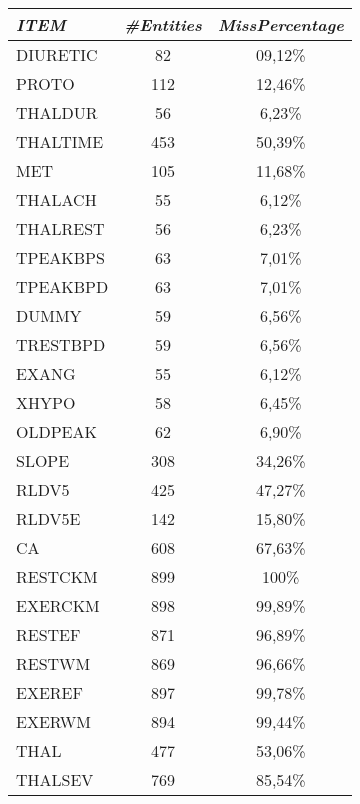 \documentclass[a4paper,12pt]{article}
\begin{document}
\begin{multicols}{2}
\begin{tabular}{|l|c|c|}
            
            \end{tabular}
            \begin{tabular}{|l|c|c|} \hline    
                
                \textit{ITEM} 	& \textit{\#Entities}	& \textit{MissPercentage} \\
                \hline DIURETIC	& 	82	&	09,12\% \\
                \hline PROTO	&	112		&	12,46\% \\
                \hline THALDUR	&	56		&	6,23\% \\
                \hline THALTIME	&	453		&	50,39\% \\
                \hline MET		& 	105		&	11,68\% \\
                \hline THALACH	&	55		&	6,12\% \\
                \hline THALREST	&	56		&	6,23\% \\
                \hline TPEAKBPS	&	63		&	7,01\% \\
                \hline TPEAKBPD	&	63		&	7,01\% \\
                \hline DUMMY	&	59		&	6,56\% \\
                \hline TRESTBPD	&	59		&	6,56\% \\
                \hline EXANG	&	55		&	6,12\% \\
                \hline XHYPO	&	58		&	6,45\% \\
                \hline OLDPEAK	&	62		&	6,90\% \\
                \hline SLOPE	&	308		&	34,26\% \\
                \hline RLDV5	&	425		&	47,27\% \\
                \hline RLDV5E	&	142		&	15,80\% \\
                \hline CA		&	608		&	67,63\% \\
                \hline RESTCKM	&	899		&	100\% \\
                \hline EXERCKM	&	898		&	99,89\% \\
                \hline RESTEF	&	871		&	96,89\% \\
                \hline RESTWM	&	869		&	96,66\% \\
                \hline EXEREF	&	897		&	99,78\% \\
                \hline EXERWM	&	894		&	99,44\% \\
                \hline THAL		&	477		&	53,06\% \\
                \hline THALSEV	&	769		&	85,54\% \\ \hline
                
            
            \end{tabular}
            
        \end{multicols}
\end{document}
